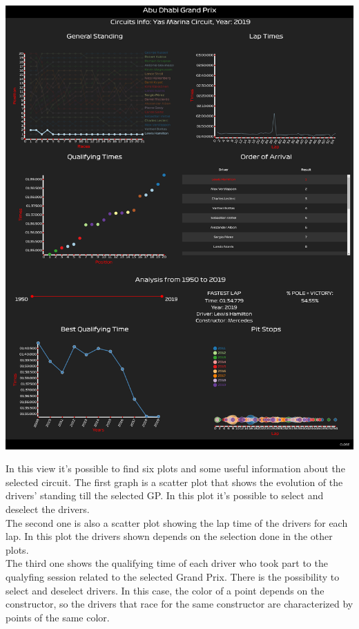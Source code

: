 \documentclass[11pt,twocolumn,letterpaper]{article}
\begin{document}
\begin{center}
	\centering
	\includegraphics[width=\columnwidth]{map-clicked}
\end{center}
In this view it's possible to find six plots and some useful information about the selected circuit.
The first graph is a scatter plot that shows the evolution of the drivers' standing till the selected GP. In this plot it's possible to select and deselect the drivers. \\
The second one is also a scatter plot showing the lap time of the drivers for each lap. In this plot the drivers shown depends on the selection done in the other plots.\\
The third one shows the qualifying time of each driver who took part to the qualyfing session related to the selected Grand Prix. There is the possibility to select and deselect drivers. In this case, the color of a point depends on the constructor, so the drivers that race for the same constructor are characterized by points of the same color.\\
\end{document}
